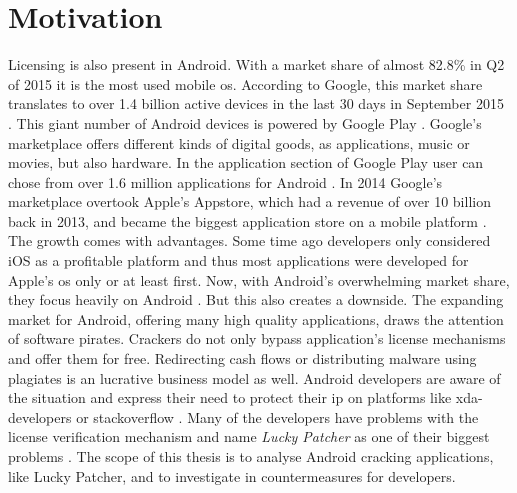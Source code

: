 \section{Motivation} \label{subsection:introduction-motivation}
Licensing is also present in Android.
With a market share of almost 82.8\% in Q2 of 2015 \cite{androidShare} it is the most used mobile \gls{os}.
According to Google, this market share translates to over 1.4 billion active devices in the last 30 days in September 2015 \cite{androidDevices}.
This giant number of Android devices is powered by Google Play \cite{googlePlay}.
Google's marketplace offers different kinds of digital goods, as applications, music or movies, but also hardware.
In the application section of Google Play user can chose from over 1.6 million applications for Android \cite{statistaAppStore}.
In 2014 Google's marketplace overtook Apple's Appstore, which had a revenue of over 10 billion back in 2013, and became the biggest application store on a mobile platform \cite{wiwoValue}.
\newline
The growth comes with advantages.
Some time ago developers only considered iOS as a profitable platform and thus most applications were developed for Apple's \gls{os} only or at least first.
Now, with Android's overwhelming market share, they focus heavily on Android \cite{businessProfit}.
But this also creates a downside.
The expanding market for Android, offering many high quality applications, draws the attention of software pirates.
Crackers do not only bypass application's license mechanisms and offer them for free.
Redirecting cash flows or distributing malware using plagiates is an lucrative business model as well.
\newline
Android developers are aware of the situation \cite{developersPiracy} and express their need to protect their \gls{ip} on platforms like xda-developers \cite{xdaPiracy} or stackoverflow \cite{stackoverflowPiracy}.
Many of the developers have problems with the license verification mechanism and name \textit{Lucky Patcher} as one of their biggest problems \cite{stackoverflowLucky}.
\newline
\newline
The scope of this thesis is to analyse Android cracking applications, like Lucky Patcher, and to investigate in countermeasures for developers.

